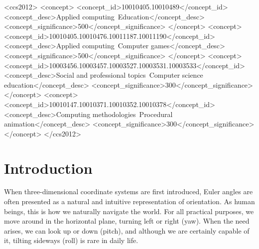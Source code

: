 \documentclass[sigconf]{acmart}
\begin{document}
\begin{CCSXML}
<ccs2012>
   <concept>
       <concept_id>10010405.10010489</concept_id>
       <concept_desc>Applied computing~Education</concept_desc>
       <concept_significance>500</concept_significance>
       </concept>
   <concept>
       <concept_id>10010405.10010476.10011187.10011190</concept_id>
       <concept_desc>Applied computing~Computer games</concept_desc>
       <concept_significance>500</concept_significance>
       </concept>
   <concept>
       <concept_id>10003456.10003457.10003527.10003531.10003533</concept_id>
       <concept_desc>Social and professional topics~Computer science education</concept_desc>
       <concept_significance>300</concept_significance>
       </concept>
    <concept>
        <concept_id>10010147.10010371.10010352.10010378</concept_id>
        <concept_desc>Computing methodologies~Procedural animation</concept_desc>
        <concept_significance>300</concept_significance>
        </concept>
 </ccs2012>
\end{CCSXML}



\maketitle

\section{Introduction}
When three-dimensional coordinate systems are first introduced, Euler angles are often presented as a natural and intuitive representation of orientation. As human beings, this is how we naturally navigate the world. For all practical purposes, we move around in the horizontal plane, turning left or right (yaw). When the need arises, we can look up or down (pitch), and although we are certainly capable of it, tilting sideways (roll) is rare in daily life.
\end{document}

